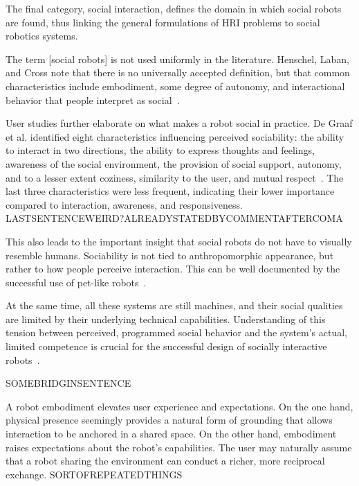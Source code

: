 
The final category, social interaction, defines the domain in which social robots are found, thus linking the general formulations of HRI problems to social robotics systems.

The term [social robots] is not used uniformly in the literature. Henschel, Laban, and Cross note that there is no universally accepted definition, but that common characteristics include embodiment, some degree of autonomy, and interactional behavior that people interpret as social~\cite[11--12]{henschel_what_2021}.

User studies further elaborate on what makes a robot social in practice. De Graaf et al. identified eight characteristics influencing perceived sociability: the ability to interact in two directions, the ability to express thoughts and feelings, awareness of the social environment, the provision of social support, autonomy, and to a lesser extent coziness, similarity to the user, and mutual respect~\cite{de_graaf_what_2015}. The last three characteristics were less frequent, indicating their lower importance compared to interaction, awareness, and responsiveness. LASTSENTENCEWEIRD?ALREADYSTATEDBYCOMMENTAFTERCOMA


This also leads to the important insight that social robots do not have to visually resemble humans. Sociability is not tied to anthropomorphic appearance, but rather to how people perceive interaction. This can be well documented by the successful use of pet-like robots~\cite[10]{henschel_what_2021}.

At the same time, all these systems are still machines, and their social qualities are limited by their underlying technical capabilities. Understanding of this tension between perceived, programmed social behavior and the system's actual, limited competence is crucial for the successful design of socially interactive robots~\cite{cross_mind_2021}.

SOMEBRIDGINSENTENCE

A robot embodiment elevates user experience and expectations. On the one hand, physical presence seemingly provides a natural form of grounding that allows interaction to be anchored in a shared space. On the other hand, embodiment raises expectations about the robot's capabilities. The user may naturally assume that a robot sharing the environment can conduct a richer, more reciprocal exchange. SORTOFREPEATEDTHINGS

